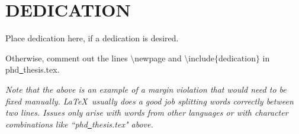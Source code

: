 
\chapter*{DEDICATION}

Place dedication here, if a dedication is desired.



Otherwise, comment out
the lines
$\setminus $newpage
and
$\setminus $include$\{ $dedication$\} $
in phd\underline{~}thesis.tex.


{\em 
Note that the above is an example of a margin violation 
that would need to be fixed manually. \LaTeX \ 
usually does a good job splitting words correctly between two lines. 
Issues only arise with words from other languages or with 
character combinations like 
``phd\underline{~}thesis.tex"
above.}